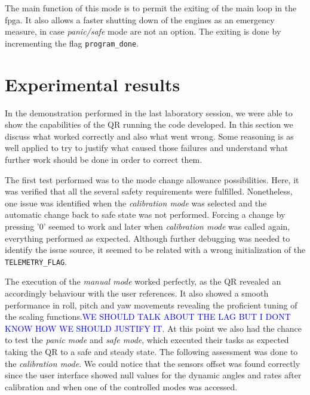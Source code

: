\documentclass{article}
\newcommand\todo[1]{\textcolor{blue}{#1}} %
\begin{document}
The main function of this mode is to permit the exiting of the main loop in the fpga. It also allows a faster shutting down of the engines as an emergency measure, in case \textit{panic/safe} mode are not an option. The exiting is done by incrementing the flag \texttt{program\_done}.





\section{Experimental results}
\label{sec:results}
In the demonstration performed in the last laboratory session, we were able to show the capabilities of the QR running the code developed. In this section we discuss what worked correctly and also what went wrong. Some reasoning is as well applied to try to justify what caused those failures and understand what further work should be done in order to correct them.

The first test performed was to the mode change allowance possibilities. Here, it was verified that all the several safety requirements were fulfilled. Nonetheless, one issue was identified when the \textit{calibration mode} was selected and the automatic change back to safe state was not performed. Forcing a change by pressing '$0$' seemed to work and later when \textit{calibration mode} was called again, everything performed as expected. Although further debugging was needed to identify the issue source, it seemed to be related with a wrong initialization of the \texttt{TELEMETRY\_FLAG}.

The execution of the \textit{manual mode} worked perfectly, as the QR revealed an accordingly behaviour with the user references. It also showed a smooth performance in roll, pitch and yaw movements revealing the proficient tuning of the scaling functions.\todo{WE SHOULD TALK ABOUT THE LAG BUT I DONT KNOW HOW WE SHOULD JUSTIFY IT}. At this point we also had the chance to test the \textit{panic mode} and \textit{safe mode}, which executed their tasks as expected taking the QR to a safe and steady state. The following assessment was done to the \textit{calibration mode}. We could notice that the sensors offset was found correctly since the user interface showed null values for the dynamic angles and rates after calibration and when one of the controlled modes was accessed.
\end{document}

